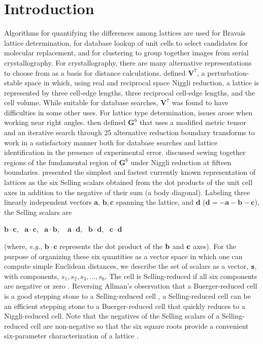 \documentclass[preprint]{iucr}              %
\newcommand{\vdotv}[2]{${\mathbf{#1} \cdot \mathbf{#2}}$}
\begin{document}
\section{Introduction}

Algorithms for quantifying the differences among lattices are used for 
Bravais lattice determination, for database lookup of unit cells to select 
candidates for molecular replacement, and for clustering to 
group together images from serial crystallography. For crystallography,
there are many alternative representations to choose from as 
a basis for distance calculations.   defined
$\mathbf{V}^7$, a perturbation-stable space in which, using real and 
reciprocal space Niggli
reduction, a lattice is represented by three cell-edge lengths, three reciprocal 
cell-edge lengths, and the cell volume.  While suitable for database
searches, $\mathbf{V}^7$ was found to have difficulties in some other uses. For lattice type determination, issues arose when working near right angles. 
  then
defined $\mathbf{G}^6$ that uses a modified metric tensor and an iterative search through 25 alternative
reduction boundary transforms \cite{Gruber1973} to work in a satisfactory manner both for
database searches and lattice identification in the presence of experimental
error.   discussed sewing together regions of the fundamental
region of $\mathbf{G}^6$ under Niggli reduction at fifteen boundaries.   
presented the simplest and  fastest currently known representation of lattices as the six Selling 
scalars obtained from the dot products of the unit cell axes in 
addition to the negative of their sum (a body diagonal). Labeling 
three linearly independent vectors $\mathbf{a},\, \mathbf{b}, \mathbf{c}$ spanning the lattice, and $\mathbf{d}$ ($\mathbf{d} = -\mathbf{a}-\!\mathbf{b}-\!\mathbf{c}$), 
the Selling scalars are
	
\begin{center}
	\vdotv{b}{c},~ \vdotv{a}{c},~ \vdotv{a}{b},
	~ \vdotv{a}{d},~ \vdotv{b}{d},~ \vdotv{c}{d}
\end{center}

\noindent{}(where, {\it e.g.}, \vdotv{b}{c}   represents the dot product of 
	the $\bf{b}$  and $\bf{c}$  axes). For the purpose of organizing 
	these six quantities as a vector space in which one can
compute simple Euclidean distances, we describe the set of scalars as a 
vector, $\bf{s}$, with components, $ s_1, s_2, s_3, ..., s_6 $.  
The cell is Selling-reduced if all six components are negative or zero \cite{Delone1933}.  
Reversing Allman's observation that a Buerger-reduced 
cell is a good stepping stone to a Selling-reduced cell \cite{Allmann1968},
a Selling-reduced cell can be an efficient stepping stone to
a  Buerger-reduced cell that quickly reduces to a Niggli-reduced cell.
Note that the negatives of the Selling scalars of a Selling-reduced cell
are non-negative so that the six square roots provide a convenient six-parameter 
characterization of a lattice \cite{kurlin2022complete}.
\end{document}
